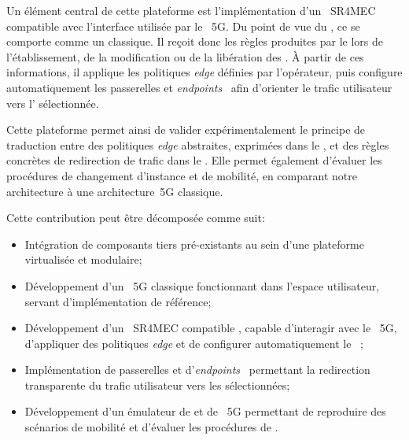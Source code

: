 \documentclass[../main.tex]{subfiles}
\begin{document}
Un élément central de cette plateforme est l'implémentation d'un ~SR4MEC compatible avec l’interface  utilisée par le ~5G.
Du point de vue du , ce  se comporte comme un  classique.
Il reçoit donc les règles produites par le  lors de l’établissement, de la modification ou de la libération des .
À partir de ces informations, il applique les politiques \textit{edge} définies par l’opérateur, puis configure automatiquement les passerelles et \textit{endpoints}~ afin d'orienter le trafic utilisateur vers l’ sélectionnée.

Cette plateforme permet ainsi de valider expérimentalement le principe de traduction entre des politiques \textit{edge} abstraites, exprimées dans le , et des règles concrètes de redirection de trafic dans le .
Elle permet également d’évaluer les procédures de changement d’instance et de mobilité, en comparant notre architecture à une architecture~5G classique.

Cette contribution peut être décomposée comme suit:
\begin{itemize}
    \item Intégration de composants tiers pré-existants au sein d’une plateforme virtualisée et modulaire;
    \item Développement d’un ~5G classique fonctionnant dans l’espace utilisateur, servant d’implémentation de référence;
    \item Développement d’un ~SR4MEC compatible , capable d’interagir avec le ~5G, d’appliquer des politiques \textit{edge} et de configurer automatiquement le ~;
    \item Implémentation de passerelles et d’\textit{endpoints}~ permettant la redirection transparente du trafic utilisateur vers les  sélectionnées;
    \item Développement d’un émulateur de  et de ~5G permettant de reproduire des scénarios de mobilité et d’évaluer les procédures de .
\end{itemize}
\endgroup
\end{document}
